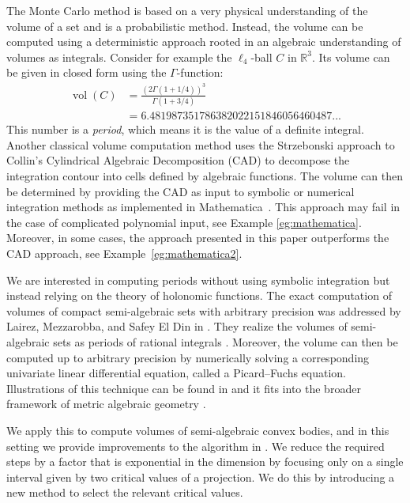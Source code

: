 \documentclass[sigconf, nonacm]{acmart} %
\DeclareMathOperator{\vol}{vol}
\begin{document}
The Monte Carlo method is based on a very physical understanding of the volume of a set and is a probabilistic method. Instead, the volume can be computed using a deterministic approach rooted in an algebraic understanding of volumes as integrals. Consider for example the $\ell_4$-ball $C$ in $\mathbb R^3$. Its volume can be given in closed form using the $\Gamma$-function: 
\begin{align*}
    \vol(C) &=\frac{( 2 \Gamma(1 + 1/4))^3}{\Gamma(1 + 3/4)} \\&
= 6.481987351786382022151846056460487...
\end{align*}
This number is a \textit{period}, which means it is the value of a definite integral.
Another classical volume computation method uses the Strzebonski approach \cite{Strzebonski_volumes} to Collin’s Cylindrical Algebraic Decomposition \cite{Collins-CAD} (CAD) to decompose the integration contour into cells defined by algebraic functions. The volume can then be determined by providing the CAD as input to symbolic or numerical integration methods as implemented in Mathematica~\cite{Mathematica14}. This approach may fail in the case of complicated polynomial input, see Example \ref{eg:mathematica}. Moreover, in some cases, the approach presented in this paper outperforms the CAD approach, see Example~\ref{eg:mathematica2}.

We are interested in computing periods without using symbolic integration but instead relying on the theory of holonomic functions. 
The exact computation of volumes of compact semi-algebraic sets with arbitrary precision was addressed by Lairez, Mezzarobba, and Safey El Din in \cite{Lairez_volumes_semi_algebraic_sets}. They realize the volumes of semi-algebraic sets as periods of rational integrals \cite{Lairez-periods}. Moreover, the volume can then be computed up to arbitrary precision by numerically solving a corresponding univariate linear differential equation, called a Picard--Fuchs equation. Illustrations of this technique can be found in \cite[§ 2]{SatStu25} and it fits into the broader framework of metric algebraic geometry \cite[Ch. 14]{Breiding_Kohn_Sturmfels_2024}.

We apply this to compute volumes of semi-algebraic convex bodies, and in this setting we provide improvements to the algorithm in \cite{Lairez_volumes_semi_algebraic_sets}. We reduce the required steps by a factor that is exponential in the dimension by focusing only on a single interval given by two critical values of a projection. We do this by introducing a new method to select the relevant critical values. 
\end{document}
